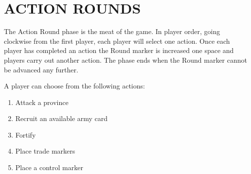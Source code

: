 \section{ACTION ROUNDS}

The Action Round phase is the meat of the game. In player order, going clockwise from the first player, each player will select one action. Once each player has completed an action the Round marker is increased one space and players carry out another action. The phase ends when the Round marker cannot be advanced any further.

A player can choose from the following actions:

\begin{enumerate}[nosep]
  \item Attack a province
  \item Recruit an available army card
  \item Fortify
  \item Place trade markers
  \item Place a control marker
\end{enumerate}